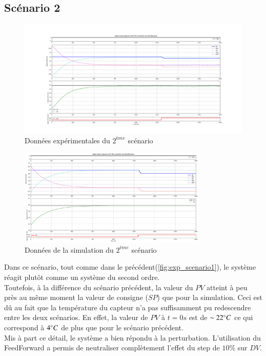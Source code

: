 \subsection{Scénario 2}

\begin{figure}[H]
	\centering
	\includegraphics[width=1\textwidth]{../Plots/Experiment_scenario_3_2024-03-30-19h18.png}
	\caption{Données expérimentales du $2^{ème}$ scénario}
	\label{fig:exp_scenario2}
\end{figure}
\begin{figure}[H]
	\centering
	\includegraphics[width=0.8\textwidth]{figures/scenario3.png}
	\caption{Données de la simulation du $2^{ème}$ scénario}
	\label{fig:sim_scenario2}
\end{figure}

Dans ce scénario, tout comme dans le précédent(\ref{fig:exp_scenario1}), le système réagit plutôt comme un système du second ordre.
\\Toutefois, à la différence du scénario précédent, la valeur du $PV$ atteint à peu près au même moment la valeur de consigne ($SP$) que pour la simulation. Ceci est dû au fait
que la température du capteur n'a pas suffisamment pu redescendre entre les deux scénarios. En effet, la valeur de $PV$ à $t = 0s$ est de $\sim 22\degree C$ ce qui correspond 
à $4\degree C$ de plus que pour le scénario précédent. 
\\Mis à part ce détail, le système a bien répondu à la perturbation. L'utilisation du FeedForward a permis de neutraliser complètement l'effet du step de $10\%$ sur $DV$.

